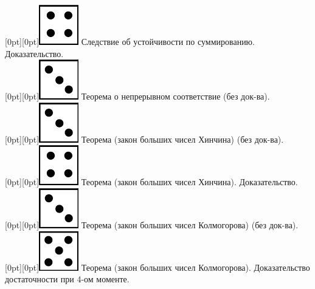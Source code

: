 \documentclass[10pt]{amsart}
\begin{document}
\begin{enumerate}
\begin{enumerate}
 \raisebox{-1pt}[0pt][0pt]{\includegraphics[width=0.02\linewidth]{4.png}} Следствие об устойчивости по суммированию. Доказательство. \\
 \raisebox{-1pt}[0pt][0pt]{\includegraphics[width=0.02\linewidth]{3.png}} Теорема о непрерывном соответствие (без док-ва). \\
 \raisebox{-1pt}[0pt][0pt]{\includegraphics[width=0.02\linewidth]{3.png}} Теорема (закон больших чисел Хинчина) (без док-ва). \\
 \raisebox{-1pt}[0pt][0pt]{\includegraphics[width=0.02\linewidth]{4.png}}  Теорема (закон больших чисел Хинчина).  Доказательство. \\
 \raisebox{-1pt}[0pt][0pt]{\includegraphics[width=0.02\linewidth]{3.png}} Теорема (закон больших чисел Колмогорова) (без док-ва). \\
 \raisebox{-1pt}[0pt][0pt]{\includegraphics[width=0.02\linewidth]{5.png}} Теорема (закон больших чисел Колмогорова). Доказательство достаточности при 4-ом моменте. \\

 


\end{enumerate}
\end{enumerate}
\end{document}
